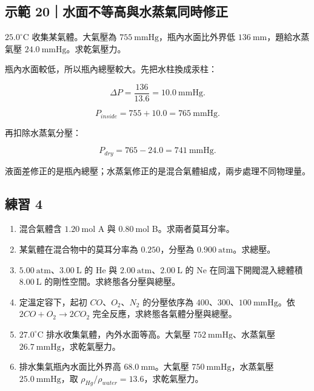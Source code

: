 \documentclass[11pt,a4paper]{article}
\providecommand{\tightlist}{%
  \setlength{\itemsep}{0pt}\setlength{\parskip}{0pt}}
\begin{document}
\begin{HandoutWorkedExample}

\subsection{示範 20｜水面不等高與水蒸氣同時修正}\label{ux793aux7bc4-20ux6c34ux9762ux4e0dux7b49ux9ad8ux8207ux6c34ux84b8ux6c23ux540cux6642ux4feeux6b63}

\(25.0^\circ\mathrm C\) 收集某氣體。大氣壓為 \(755\ \mathrm{mmHg}\)，瓶內水面比外界低 \(136\ \mathrm{mm}\)，題給水蒸氣壓 \(24.0\ \mathrm{mmHg}\)。求乾氣壓力。

瓶內水面較低，所以瓶內總壓較大。先把水柱換成汞柱：

\[
\Delta P=\frac{136}{13.6}=10.0\ \mathrm{mmHg}.
\]

\[
P_{inside}=755+10.0=765\ \mathrm{mmHg}.
\]

再扣除水蒸氣分壓：

\[
P_{dry}=765-24.0=741\ \mathrm{mmHg}.
\]

液面差修正的是瓶內總壓；水蒸氣修正的是混合氣體組成，兩步處理不同物理量。

\end{HandoutWorkedExample}

\subsection{練習 4}\label{ux7df4ux7fd2-4}

\begin{enumerate}
\def\labelenumi{\arabic{enumi}.}
\tightlist
\item
  混合氣體含 \(1.20\ \mathrm{mol}\) A 與 \(0.80\ \mathrm{mol}\) B。求兩者莫耳分率。
\item
  某氣體在混合物中的莫耳分率為 \(0.250\)，分壓為 \(0.900\ \mathrm{atm}\)。求總壓。
\item
  \(5.00\ \mathrm{atm}\)、\(3.00\ \mathrm L\) 的 He 與 \(2.00\ \mathrm{atm}\)、\(2.00\ \mathrm L\) 的 Ne 在同溫下開閥混入總體積 \(8.00\ \mathrm L\) 的剛性空間。求終態各分壓與總壓。
\item
  定溫定容下，起初 \(CO\)、\(O_2\)、\(N_2\) 的分壓依序為 \(400\)、\(300\)、\(100\ \mathrm{mmHg}\)。依 \(2CO+O_2\rightarrow2CO_2\) 完全反應，求終態各氣體分壓與總壓。
\item
  \(27.0^\circ\mathrm C\) 排水收集氣體，內外水面等高。大氣壓 \(752\ \mathrm{mmHg}\)、水蒸氣壓 \(26.7\ \mathrm{mmHg}\)，求乾氣壓力。
\item
  排水集氣瓶內水面比外界高 \(68.0\ \mathrm{mm}\)。大氣壓 \(750\ \mathrm{mmHg}\)，水蒸氣壓 \(25.0\ \mathrm{mmHg}\)，取 \(\rho_{Hg}/\rho_{water}=13.6\)，求乾氣壓力。
\end{enumerate}
\end{document}
